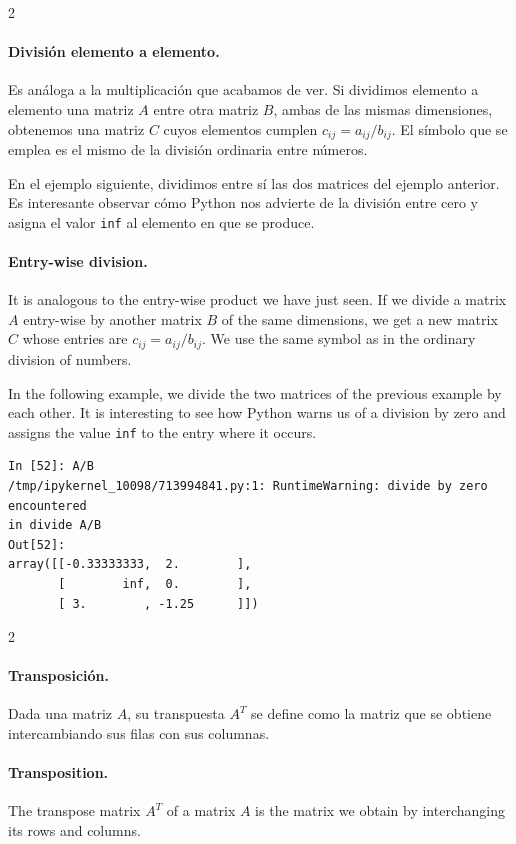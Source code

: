 \begin{paracol}{2}
\paragraph{División elemento a elemento.} Es análoga a la multiplicación que acabamos de ver. Si dividimos elemento a elemento una matriz $A$ entre otra matriz $B$, ambas de las mismas dimensiones, obtenemos una matriz $C$ cuyos elementos cumplen $c_{ij} = a_{ij}/b_{ij}$. El símbolo que se emplea es el mismo de la división ordinaria entre números.

En el ejemplo siguiente, dividimos entre sí las dos matrices del ejemplo anterior. Es interesante observar cómo Python nos advierte de la división entre cero y asigna el valor \texttt{inf} al elemento en que se produce.

\switchcolumn
\paragraph{Entry-wise division.} It is analogous to the entry-wise product we have just seen. If we divide a matrix $A$ entry-wise by another matrix $B$ of the same dimensions, we get a new matrix $C$ whose entries are $c_{ij} = a_{ij}/b_{ij}$. We use the same symbol as in the ordinary division of numbers.

In the following example, we divide the two matrices of the previous example by each other. It is interesting to see how Python warns us of a division by zero and assigns the value \texttt{inf} to the entry where it occurs.
  

 
\end{paracol}
\begin{center}
    \begin{minipage}{\textwidth}
        \begin{verbatim}
In [52]: A/B
/tmp/ipykernel_10098/713994841.py:1: RuntimeWarning: divide by zero encountered 
in divide A/B
Out[52]: 
array([[-0.33333333,  2.        ],
       [        inf,  0.        ],
       [ 3.        , -1.25      ]])
\end{verbatim}
\end{minipage}
\end{center}

\begin{paracol}{2}
\paragraph{Transposición.} Dada una matriz $A$, su transpuesta $A^T$ se define como la matriz que se obtiene intercambiando sus filas con sus columnas.
\switchcolumn
\paragraph{Transposition.} The transpose matrix $A^T$ of a matrix $A$ is the matrix we obtain by interchanging its rows and columns.      
\end{paracol}


